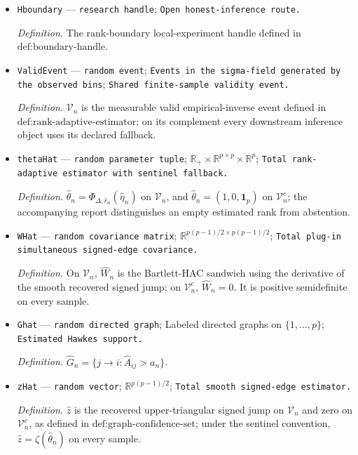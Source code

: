 \documentclass{article}
\begin{document}
\begin{itemize}
  \par\smallskip\noindent\emph{Definition.} The one-lag compatibility-fiber handle defined in \(\text{def:one-lag-handle}\).
  \item \texttt{Hboundary} --- \texttt{research handle}; \texttt{Open honest-\allowbreak{}inference route.}
  \par\smallskip\noindent\emph{Definition.} The rank-boundary local-experiment handle defined in \(\text{def:boundary-handle}\).
  \item \texttt{ValidEvent} --- \texttt{random event}; \texttt{Events in the sigma-\allowbreak{}field generated by the observed bins}; \texttt{Shared finite-\allowbreak{}sample validity event.}
  \par\smallskip\noindent\emph{Definition.} \(\mathcal V_n\) is the measurable valid empirical-inverse event defined in \(\text{def:rank-adaptive-estimator}\); on its complement every downstream inference object uses its declared fallback.
  \item \texttt{thetaHat} --- \texttt{random parameter tuple}; \(\mathbb R_{+}\times\mathbb R^{p\times p}\times\mathbb R^p\); \texttt{Total rank-\allowbreak{}adaptive estimator with sentinel fallback.}
  \par\smallskip\noindent\emph{Definition.} \(\widehat\theta_n=\Phi_{\Delta,\widehat r_n}(\widehat\eta_n)\) on \(\mathcal V_n\), and \(\widehat\theta_n=(1,0,\mathbf1_p)\) on \(\mathcal V_n^c\); the accompanying report distinguishes an empty estimated rank from abstention.
  \item \texttt{WHat} --- \texttt{random covariance matrix}; \(\mathbb R^{p(p-1)/2\times p(p-1)/2}\); \texttt{Total plug-\allowbreak{}in simultaneous signed-\allowbreak{}edge covariance.}
  \par\smallskip\noindent\emph{Definition.} On \(\mathcal V_n\), \(\widehat W_n\) is the Bartlett-HAC sandwich using the derivative of the smooth recovered signed jump; on \(\mathcal V_n^c\), \(\widehat W_n=0\). It is positive semidefinite on every sample.
  \item \texttt{Ghat} --- \texttt{random directed graph}; Labeled directed graphs on \(\{1,\ldots,p\}\); \texttt{Estimated Hawkes support.}
  \par\smallskip\noindent\emph{Definition.} \(\widehat G_n=\{j\to i:\widehat A_{ij}>a_n\}\).
  \item \texttt{zHat} --- \texttt{random vector}; \(\mathbb R^{p(p-1)/2}\); \texttt{Total smooth signed-\allowbreak{}edge estimator.}
  \par\smallskip\noindent\emph{Definition.} \(\widehat z\) is the recovered upper-triangular signed jump on \(\mathcal V_n\) and zero on \(\mathcal V_n^c\), as defined in \(\text{def:graph-confidence-set}\); under the sentinel convention, \(\widehat z=\zeta(\widehat\theta_n)\) on every sample.

\end{itemize}
\end{document}
